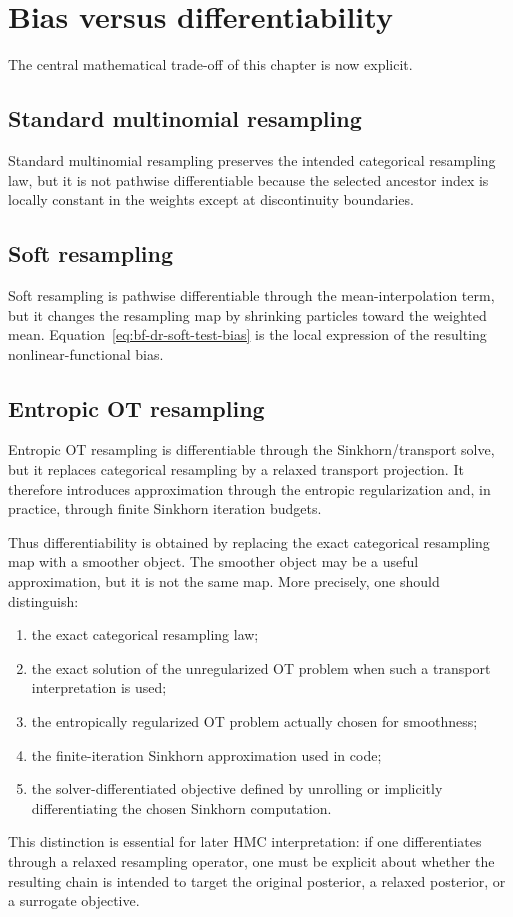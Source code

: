 \section{Bias versus differentiability}
\label{sec:bf-dr-bias-vs-diff}

The central mathematical trade-off of this chapter is now explicit.

\subsection{Standard multinomial resampling}

Standard multinomial resampling preserves the intended categorical resampling
law, but it is not pathwise differentiable because the selected ancestor index is
locally constant in the weights except at discontinuity boundaries.

\subsection{Soft resampling}

Soft resampling is pathwise differentiable through the mean-interpolation term,
but it changes the resampling map by shrinking particles toward the weighted
mean.  Equation~\eqref{eq:bf-dr-soft-test-bias} is the local expression of the
resulting nonlinear-functional bias.

\subsection{Entropic OT resampling}

Entropic OT resampling is differentiable through the Sinkhorn/transport solve,
but it replaces categorical resampling by a relaxed transport projection.  It
therefore introduces approximation through the entropic regularization and, in
practice, through finite Sinkhorn iteration budgets.

Thus differentiability is obtained by replacing the exact categorical resampling
map with a smoother object.  The smoother object may be a useful approximation,
but it is not the same map.  More precisely, one should distinguish:
\begin{enumerate}[label=(\roman*)]
  \item the exact categorical resampling law;
  \item the exact solution of the unregularized OT problem when such a transport
    interpretation is used;
  \item the entropically regularized OT problem actually chosen for smoothness;
  \item the finite-iteration Sinkhorn approximation used in code;
  \item the solver-differentiated objective defined by unrolling or implicitly
    differentiating the chosen Sinkhorn computation.
\end{enumerate}
This distinction is essential for later HMC interpretation: if one differentiates
through a relaxed resampling operator, one must be explicit about whether the
resulting chain is intended to target the original posterior, a relaxed
posterior, or a surrogate objective.

